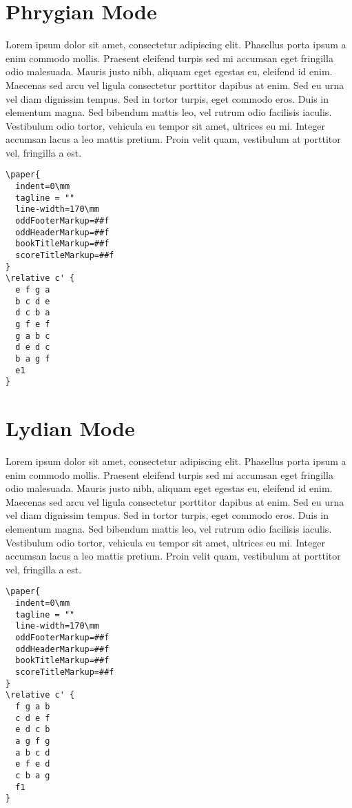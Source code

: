 \documentclass[11pt]{article}
\begin{document}
\section*{Phrygian Mode}
\label{sec:org420efda}

Lorem ipsum dolor sit amet, consectetur adipiscing elit. Phasellus
porta ipsum a enim commodo mollis. Praesent eleifend turpis sed mi
accumsan eget fringilla odio malesuada. Mauris justo nibh, aliquam
eget egestas eu, eleifend id enim. Maecenas sed arcu vel ligula
consectetur porttitor dapibus at enim. Sed eu urna vel diam dignissim
tempus. Sed in tortor turpis, eget commodo eros. Duis in elementum
magna. Sed bibendum mattis leo, vel rutrum odio facilisis iaculis.
Vestibulum odio tortor, vehicula eu tempor sit amet, ultrices eu mi.
Integer accumsan lacus a leo mattis pretium. Proin velit quam,
vestibulum at porttitor vel, fringilla a est.

\begin{verbatim}
\paper{
  indent=0\mm
  tagline = ""
  line-width=170\mm
  oddFooterMarkup=##f
  oddHeaderMarkup=##f
  bookTitleMarkup=##f
  scoreTitleMarkup=##f
}
\relative c' {
  e f g a
  b c d e
  d c b a
  g f e f
  g a b c
  d e d c
  b a g f
  e1
}
\end{verbatim}

\section*{Lydian Mode}
\label{sec:org5b1b563}

Lorem ipsum dolor sit amet, consectetur adipiscing elit. Phasellus
porta ipsum a enim commodo mollis. Praesent eleifend turpis sed mi
accumsan eget fringilla odio malesuada. Mauris justo nibh, aliquam
eget egestas eu, eleifend id enim. Maecenas sed arcu vel ligula
consectetur porttitor dapibus at enim. Sed eu urna vel diam dignissim
tempus. Sed in tortor turpis, eget commodo eros. Duis in elementum
magna. Sed bibendum mattis leo, vel rutrum odio facilisis iaculis.
Vestibulum odio tortor, vehicula eu tempor sit amet, ultrices eu mi.
Integer accumsan lacus a leo mattis pretium. Proin velit quam,
vestibulum at porttitor vel, fringilla a est.

\begin{verbatim}
\paper{
  indent=0\mm
  tagline = ""
  line-width=170\mm
  oddFooterMarkup=##f
  oddHeaderMarkup=##f
  bookTitleMarkup=##f
  scoreTitleMarkup=##f
}
\relative c' {
  f g a b
  c d e f
  e d c b
  a g f g
  a b c d
  e f e d
  c b a g
  f1
}
\end{verbatim}
\end{document}
